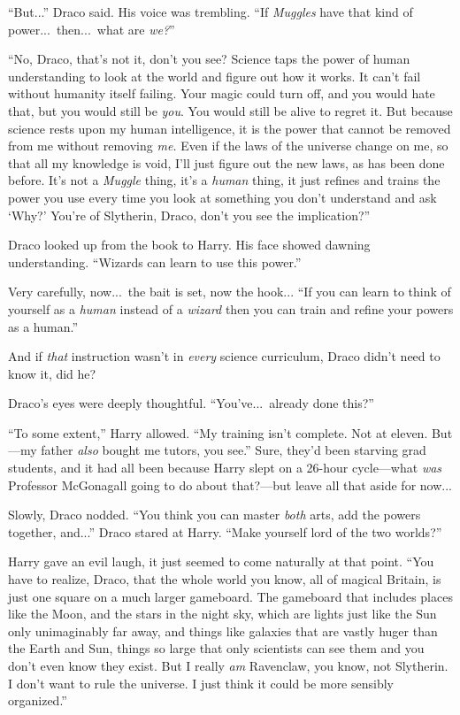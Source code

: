 “But...” Draco said. His voice was trembling. “If \emph{Muggles} have that kind of power...\ then...\ what are \emph{we?}”

“No, Draco, that’s not it, don’t you see? Science taps the power of human understanding to look at the world and figure out how it works. It can’t fail without humanity itself failing. Your magic could turn off, and you would hate that, but you would still be \emph{you}. You would still be alive to regret it. But because science rests upon my human intelligence, it is the power that cannot be removed from me without removing \emph{me.} Even if the laws of the universe change on me, so that all my knowledge is void, I’ll just figure out the new laws, as has been done before. It’s not a \emph{Muggle} thing, it’s a \emph{human} thing, it just refines and trains the power you use every time you look at something you don’t understand and ask ‘Why?’ You’re of Slytherin, Draco, don’t you see the implication?”

Draco looked up from the book to Harry. His face showed dawning understanding. “Wizards can learn to use this power.”

Very carefully, now...\ the bait is set, now the hook... “If you can learn to think of yourself as a \emph{human} instead of a \emph{wizard} then you can train and refine your powers as a human.”

And if \emph{that} instruction wasn’t in \emph{every} science curriculum, Draco didn’t need to know it, did he?

Draco’s eyes were deeply thoughtful. “You’ve...\ already done this?”

“To some extent,” Harry allowed. “My training isn’t complete. Not at eleven. But—my father \emph{also} bought me tutors, you see.” Sure, they’d been starving grad students, and it had all been because Harry slept on a 26-hour cycle—what \emph{was} Professor McGonagall going to do about that?—but leave all that aside for now...

Slowly, Draco nodded. “You think you can master \emph{both} arts, add the powers together, and...” Draco stared at Harry. “Make yourself lord of the two worlds?”

Harry gave an evil laugh, it just seemed to come naturally at that point. “You have to realize, Draco, that the whole world you know, all of magical Britain, is just one square on a much larger gameboard. The gameboard that includes places like the Moon, and the stars in the night sky, which are lights just like the Sun only unimaginably far away, and things like galaxies that are vastly huger than the Earth and Sun, things so large that only scientists can see them and you don’t even know they exist. But I really \emph{am} Ravenclaw, you know, not Slytherin. I don’t want to rule the universe. I just think it could be more sensibly organized.”

